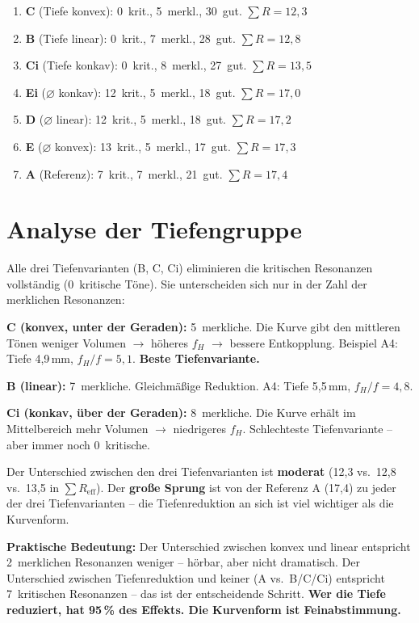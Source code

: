 \documentclass[11pt,a4paper]{article}
\begin{document}
\begin{enumerate}
\item \textbf{C} (Tiefe konvex): 0~krit., 5~merkl., 30~gut. $\sum R = 12{,}3$
\item \textbf{B} (Tiefe linear): 0~krit., 7~merkl., 28~gut. $\sum R = 12{,}8$
\item \textbf{Ci} (Tiefe konkav): 0~krit., 8~merkl., 27~gut. $\sum R = 13{,}5$
\item \textbf{Ei} ($\varnothing$ konkav): 12~krit., 5~merkl., 18~gut. $\sum R = 17{,}0$
\item \textbf{D} ($\varnothing$ linear): 12~krit., 5~merkl., 18~gut. $\sum R = 17{,}2$
\item \textbf{E} ($\varnothing$ konvex): 13~krit., 5~merkl., 17~gut. $\sum R = 17{,}3$
\item \textbf{A} (Referenz): 7~krit., 7~merkl., 21~gut. $\sum R = 17{,}4$
\end{enumerate}


\section{Analyse der Tiefengruppe}

Alle drei Tiefenvarianten (B, C, Ci) eliminieren die kritischen Resonanzen vollständig (0~kritische Töne). Sie unterscheiden sich nur in der Zahl der merklichen Resonanzen:

\textbf{C (konvex, unter der Geraden):} 5~merkliche. Die Kurve gibt den mittleren Tönen weniger Volumen $\to$ höheres $f_H$ $\to$ bessere Entkopplung. Beispiel A4: Tiefe 4{,}9\,mm, $f_H/f = 5{,}1$. \textbf{Beste Tiefenvariante.}

\textbf{B (linear):} 7~merkliche. Gleichmäßige Reduktion. A4: Tiefe 5{,}5\,mm, $f_H/f = 4{,}8$.

\textbf{Ci (konkav, über der Geraden):} 8~merkliche. Die Kurve erhält im Mittelbereich mehr Volumen $\to$ niedrigeres $f_H$. Schlechteste Tiefenvariante -- aber immer noch 0~kritische.

Der Unterschied zwischen den drei Tiefenvarianten ist \textbf{moderat} (12{,}3 vs.\ 12{,}8 vs.\ 13{,}5 in $\sum R_\text{eff}$). Der \textbf{große Sprung} ist von der Referenz A (17{,}4) zu jeder der drei Tiefenvarianten -- die Tiefenreduktion an sich ist viel wichtiger als die Kurvenform.

\begin{keybox}
\textbf{Praktische Bedeutung:} Der Unterschied zwischen konvex und linear entspricht 2~merklichen Resonanzen weniger -- hörbar, aber nicht dramatisch. Der Unterschied zwischen Tiefenreduktion und keiner (A vs.\ B/C/Ci) entspricht 7~kritischen Resonanzen -- das ist der entscheidende Schritt. \textbf{Wer die Tiefe reduziert, hat 95\,\% des Effekts. Die Kurvenform ist Feinabstimmung.}
\end{keybox}
\end{document}
